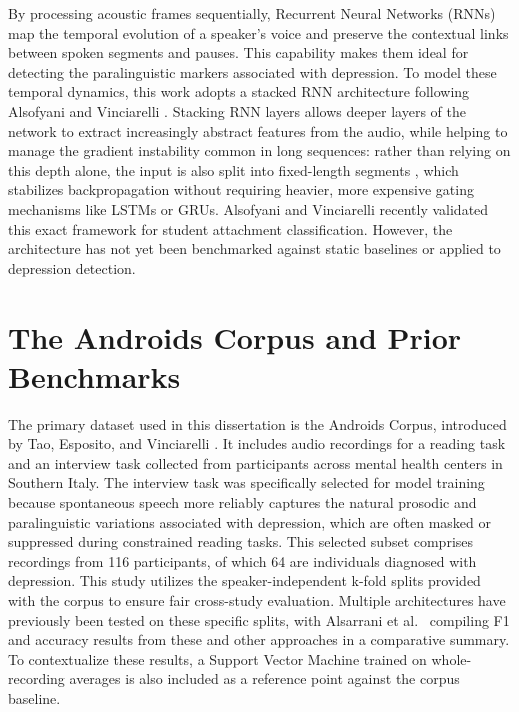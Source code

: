 \documentclass{mproj}
\begin{document}
By processing acoustic frames sequentially, Recurrent Neural Networks (RNNs) map the temporal evolution of a speaker's voice and preserve the contextual links between spoken segments and pauses. This capability makes them ideal for detecting the paralinguistic markers associated with depression. To model these temporal dynamics, this work adopts a stacked RNN architecture following Alsofyani and Vinciarelli \cite{alsofyani2021}. Stacking RNN layers allows deeper layers of the network to extract increasingly abstract features from the audio, while helping to manage the gradient instability common in long sequences: rather than relying on this depth alone, the input is also split into fixed-length segments \cite{pascanu2013}, which stabilizes backpropagation without requiring heavier, more expensive gating mechanisms like LSTMs or GRUs. Alsofyani and Vinciarelli \cite{alsofyani2021} recently validated this exact framework for student attachment classification. However, the architecture has not yet been benchmarked against static baselines or applied to depression detection.

\section{The Androids Corpus and Prior Benchmarks}\label{sec:corpus-survey}

The primary dataset used in this dissertation is the Androids Corpus, introduced by Tao, Esposito, and Vinciarelli \cite{tao2023androids}. It includes audio recordings for a reading task and an interview task collected from participants across mental health centers in Southern Italy. The interview task was specifically selected for model training because spontaneous speech more reliably captures the natural prosodic and paralinguistic variations associated with depression, which are often masked or suppressed during constrained reading tasks. This selected subset comprises recordings from 116 participants, of which 64 are individuals diagnosed with depression. This study utilizes the speaker-independent k-fold splits provided with the corpus to ensure fair cross-study evaluation. Multiple architectures have previously been tested on these specific splits, with Alsarrani et al.\ \cite{alsarrani2025} compiling F1 and accuracy results from these and other approaches in a comparative summary. To contextualize these results, a Support Vector Machine trained on whole-recording averages is also included as a reference point against the corpus baseline.
\end{document}
